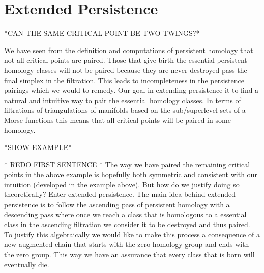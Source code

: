 





\section{Extended Persistence}

*CAN THE SAME CRITICAL POINT BE TWO TWINGS?*

We have seen from the definition and computations of persistent homology that not all critical points are paired. Those that give birth the essential persistent homology classes will not be paired because they are never destroyed pass the final simplex in the filtration. This leads to incompleteness in the persistence pairings which we would to remedy. Our goal in extending persistence it to find a natural and intuitive way to pair the essential homology classes. In terms of filtrations of triangulations of manifolds based on the sub/superlevel sets of a Morse functions this means that all critical points will be paired in some homology.

*SHOW EXAMPLE*

* REDO FIRST SENTENCE *
The way we have paired the remaining critical points in the above example is hopefully both symmetric and consistent with our intuition (developed in the example above). But how do we justify doing so theoretically? Enter extended persistence. The main idea behind extended persistence is to follow the ascending pass of persistent homology with a descending pass where once we reach a class that is homologous to a essential class in the ascending filtration we consider it to be destroyed and thus paired. To justify this algebraically we would like to make this process a consequence of a new augmented chain that starts with the zero homology group and ends with the zero group. This way we have an assurance that every class that is born will eventually die.

